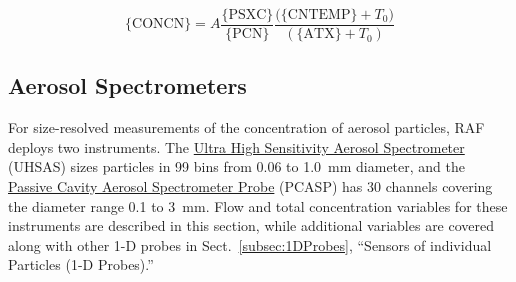 \begin{hangparagraphs}
\begin{minipage}[t]{1\columnwidth}
{\begin{minipage}[t]{0.9\textwidth}
\begin{equation}
\mathrm{\{CONCN\}}=A\frac{\mathrm{\{PSXC\}}}{\mathrm{\{PCN\}}}\frac{\mathrm{(\{CNTEMP\}}+T_{0})}{(\mathrm{\{ATX\}}+T_{0})}\label{eq:12.2}
\end{equation}
%
\end{minipage}} %
\end{minipage}

\vfill\eject
\end{hangparagraphs}


\subsection{Aerosol Spectrometers}

For size-resolved measurements of the
concentration of aerosol particles, RAF deploys two instruments. The
\href{https://www.eol.ucar.edu/instruments/ultra-high-sensitivity-aerosol-spectrometer}{Ultra High Sensitivity Aerosol Spectrometer}
(UHSAS) sizes particles in 99 bins from 0.06 to 1.0~\textgreek{m}m
diameter, and the \href{http://www.eol.ucar.edu/instruments/passive-cavity-aerosol-spectrometer-probe}{Passive Cavity Aerosol Spectrometer Probe}
(PCASP) has 30 channels covering the diameter range
0.1 to 3~\textgreek{m}m. Flow and total concentration variables for
these instruments are described in this section, while additional
variables are covered along with other 1-D probes in Sect.~\ref{subsec:1DProbes},
``Sensors of individual Particles (1-D Probes).''
